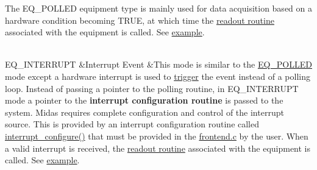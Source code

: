 \begin{table}[h]
\begin{TabularC}{3}
\begin{table}[h]
\begin{TabularC}{3}
 The EQ\_\-POLLED equipment type is mainly used for data acquisition based on a hardware condition becoming TRUE, at which time the \hyperlink{FE_table_FE_tbl_ReadoutRoutine}{readout routine} associated with the equipment is called. See \hyperlink{FE_eq_event_routines_FE_poll_event}{example}. \par
   \\
\label{FE_table_FE_tbl_EqInterrupt}
\hypertarget{FE_table_FE_tbl_EqInterrupt}{}
 \label{FE_table_idx_equipment_flags_interrupt}
\hypertarget{FE_table_idx_equipment_flags_interrupt}{}
 EQ\_\-INTERRUPT &Interrupt Event  &This mode is similar to the \hyperlink{FE_table_FE_tbl_EqPolled}{EQ\_\-POLLED} mode except a hardware interrupt is used to \hyperlink{FE_table_FE_tab_event_trigger}{trigger} the event instead of a polling loop. Instead of passing a pointer to the polling routine, in EQ\_\-INTERRUPT mode a pointer to the {\bfseries  interrupt configuration routine } is passed to the system. Midas requires complete configuration and control of the interrupt source. This is provided by an interrupt configuration routine called \hyperlink{FE_eq_event_routines_FE_interrupt_event}{interrupt\_\-configure()} that must be provided in the \hyperlink{frontend_8c}{frontend.c} by the user. When a valid interrupt is received, the \hyperlink{FE_table_FE_tbl_ReadoutRoutine}{readout routine} associated with the equipment is called. See \hyperlink{FE_eq_event_routines_FE_interrupt_event}{example}.   \\



\end{TabularC}
\end{table}
\end{TabularC}
\end{table}
